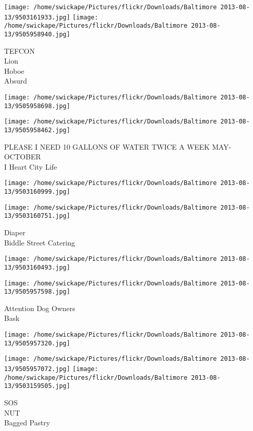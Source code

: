 \documentclass[10pt,letterpaper]{article}
\begin{document}
\texttt{[image: /home/swickape/Pictures/flickr/Downloads/Baltimore 2013-08-13/9503161933.jpg]}
\texttt{[image: /home/swickape/Pictures/flickr/Downloads/Baltimore 2013-08-13/9505958940.jpg]}

TEFCON\\
Lion\\
Hoboe\\
Absurd
\pagebreak

\texttt{[image: /home/swickape/Pictures/flickr/Downloads/Baltimore 2013-08-13/9505958698.jpg]}

\vspace{0.25in}
\texttt{[image: /home/swickape/Pictures/flickr/Downloads/Baltimore 2013-08-13/9505958462.jpg]}

PLEASE I NEED 10 GALLONS OF WATER TWICE A WEEK MAY{-}OCTOBER\\
I Heart City Life
\pagebreak

\texttt{[image: /home/swickape/Pictures/flickr/Downloads/Baltimore 2013-08-13/9503160999.jpg]}

\vspace{0.25in}
\texttt{[image: /home/swickape/Pictures/flickr/Downloads/Baltimore 2013-08-13/9503160751.jpg]}

Diaper\\
Biddle Street Catering
\pagebreak

\texttt{[image: /home/swickape/Pictures/flickr/Downloads/Baltimore 2013-08-13/9503160493.jpg]}

\vspace{0.25in}
\texttt{[image: /home/swickape/Pictures/flickr/Downloads/Baltimore 2013-08-13/9505957598.jpg]}

Attention Dog Owners\\
Bask
\pagebreak

\texttt{[image: /home/swickape/Pictures/flickr/Downloads/Baltimore 2013-08-13/9505957320.jpg]}

\vspace{0.25in}
\texttt{[image: /home/swickape/Pictures/flickr/Downloads/Baltimore 2013-08-13/9505957072.jpg]}
\texttt{[image: /home/swickape/Pictures/flickr/Downloads/Baltimore 2013-08-13/9503159505.jpg]}

SOS\\
NUT\\
Bagged Pastry
\pagebreak
\end{document}

